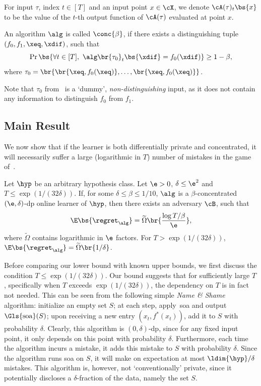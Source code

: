 For input \(\tau\), index \(t \in [T]\) and an input point \(x \in \cX\), 
we denote \(\cA(\tau)_t \bs{x}\) to be the value of the \(t\)-th output function of \(\cA(\tau)\) evaluated at point \(x\).
\begin{definition}\label{defn:beta-conc}  
    An algorithm \(\alg\) is called \(\conc{\beta}\), 
    if there exists a distinguishing tuple \((f_0, f_1, \xeq, \xdif)\), such that
    \begin{equation}
        \Pr \bs{\forall t \in [T],\ \alg \br{\tau_0}_t\bs{\xdif} = f_0(\xdif)} \geq 1 - \beta,
    \end{equation}
    where \(\tau_0 = \br{\br{\xeq, f_0(\xeq)}, \ldots, \br{\xeq, f_0(\xeq)}}\).
\end{definition}
Note that \(\tau_0\) from~ is a `dummy', \emph{non-distinguishing} input, as it does not contain any information to distinguish \(f_0\) from \(f_1\).

\subsection{Main Result}\label{sec:finite_horizon_result}
We now show that if the learner is both differentially private and concentrated, it will necessarily suffer a large (logarithmic in \(T\)) number of mistakes  in the game of~.
\begin{theorem}\label{thm:main-finite}
Let \(\hyp\) be an arbitrary hypothesis class. Let \(\e > 0\), \(\delta \leq \e^2\) and \(T \leq \exp(1 / (32\delta))\).
If, for some \(\delta \leq \beta \leq 1/10\), \(\alg\) is a \(\beta\)-concentrated \((\e, \delta)\)-\Gls{dp} online learner of \(\hyp\), then there exists an adversary \(\cB\), such that
    \begin{equation}
        \E \bs{\regret_{\alg}} = \widetilde\Omega\br{\frac{\log T / \beta}{\e}},
    \end{equation}
    where \(\widetilde \Omega\) contains logarithmic in \(\e\) factors. For \(T > \exp(1 / (32\delta))\), \(\E \bs{\regret_{\alg}} = \widetilde\Omega\br{1/\delta}\).
\end{theorem}

 Before comparing our lower bound with known upper bounds, we first discuss the condition \(T\leq \exp(1 / (32\delta))\). Our bound suggests that for sufficiently large \(T\), specifically when \(T\) exceeds \(\exp(1 / (32\delta))\), the dependency on \(T\) is in fact not needed.
This can be seen from the following simple \emph{Name \& Shame} algorithm:  initialize an empty set \(S\); at each step, apply~\Gls{soa} and output \(\mathrm{\Gls{soa}}(S)\); upon receiving a new entry \((x_t, f^\ast(x_t))\), add it to \(S\) with probability \(\delta\). Clearly, this algorithm is \((0, \delta)\)-\Gls{dp}, since for any fixed input point, it only depends on this point with probability \(\delta\).
Furthermore, each time the algorithm incurs a mistake, it adds this mistake to \(S\) with probability \(\delta\). Since the algorithm runs \Gls{soa} on \(S\), it will make on expectation at most \(\ldim{\hyp} / \delta\) mistakes.
This algorithm is, however, not `conventionally' private, since it potentially discloses a \(\delta\)-fraction of the data, namely the set \(S\).

